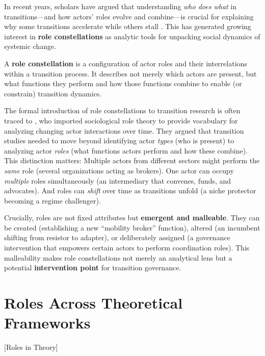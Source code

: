 \documentclass[../main.tex]{subfiles}
\begin{document}
In recent years, scholars have argued that understanding \emph{who does what} in transitions---and how actors' roles evolve and combine---is crucial for explaining why some transitions accelerate while others stall \cite{wittmayer2017roles,fischer2016actors,avelino2017power}. This has generated growing interest in \textbf{role constellations} as analytic tools for unpacking social dynamics of systemic change.

\begin{roledef}
A \textbf{role constellation} is a configuration of actor roles and their interrelations within a transition process. It describes not merely which actors are present, but what functions they perform and how those functions combine to enable (or constrain) transition dynamics.
\end{roledef}

The formal introduction of role constellations to transition research is often traced to \textcite{wittmayer2017roles}, who imported sociological role theory to provide vocabulary for analyzing changing actor interactions over time. They argued that transition studies needed to move beyond identifying actor \emph{types} (who is present) to analyzing actor \emph{roles} (what functions actors perform and how these combine). This distinction matters: Multiple actors from different sectors might perform the \emph{same} role (several organizations acting as brokers). One actor can occupy \emph{multiple} roles simultaneously (an intermediary that convenes, funds, and advocates). And roles can \emph{shift} over time as transitions unfold (a niche protector becoming a regime challenger).

Crucially, roles are not fixed attributes but \textbf{emergent and malleable}. They can be created (establishing a new ``mobility broker'' function), altered (an incumbent shifting from resistor to adapter), or deliberately assigned (a governance intervention that empowers certain actors to perform coordination roles). This malleability makes role constellations not merely an analytical lens but a potential \textbf{intervention point} for transition governance.


\section{Roles Across Theoretical Frameworks}[Roles in Theory]
\end{document}
